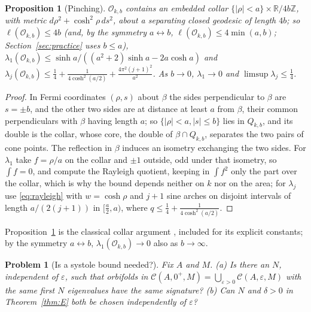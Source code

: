 \documentclass[pdflatex,sn-mathphys-num]{sn-jnl}
\theoremstyle{thmstyleone}%
\newtheorem{proposition}[theorem]{Proposition}%
\theoremstyle{thmstylethree}%
\newtheorem{problem}{Problem}%
\newcommand{\Orb}{\mathcal{O}}
\newcommand{\Cl}{\mathcal{C}}
\newcommand{\R}{\mathbb{R}}
\newcommand{\Z}{\mathbb{Z}}
\begin{document}
\begin{proposition}[Pinching]\label{prop:N2}
$\Orb_{k,b}$ contains an embedded collar $\{|\rho|<a\}\times\R/4b\Z$, with metric $d\rho^2+\cosh^2\rho\,ds^2$, about a separating closed geodesic of length $4b$; so $\ell(\Orb_{k,b})\le4b$ (and, by the symmetry $a\leftrightarrow b$, $\ell(\Orb_{k,b})\le4\min(a,b)$; Section~\ref{sec:practice} uses $b\le a$), $\lambda_1(\Orb_{k,b})\le\sinh a/((a^2+2)\sinh a-2a\cosh a)$ and $\lambda_j(\Orb_{k,b})\le\frac14+\frac1{4\cosh^2(a/2)}+\frac{4\pi^2(j+1)^2}{a^2}$. As $b\to0$, $\lambda_1\to0$ and $\limsup\lambda_j\le\frac14$.
\end{proposition}

\begin{proof}
In Fermi coordinates $(\rho,s)$ about $\beta$ the sides perpendicular to $\beta$ are $s=\pm b$, and the other two sides are at distance at least $a$ from $\beta$, their common perpendiculars with $\beta$ having length $a$; so $\{|\rho|<a,|s|\le b\}$ lies in $Q_{k,b}$, and its double is the collar, whose core, the double of $\beta\cap Q_{k,b}$, separates the two pairs of cone points. The reflection in $\beta$ induces an isometry exchanging the two sides. For $\lambda_1$ take $f=\rho/a$ on the collar and $\pm1$ outside, odd under that isometry, so $\int f=0$, and compute the Rayleigh quotient, keeping in $\int f^2$ only the part over the collar, which is why the bound depends neither on $k$ nor on the area; for $\lambda_j$ use \eqref{eq:rayleigh} with $w=\cosh\rho$ and $j+1$ sine arches on disjoint intervals of length $a/(2(j+1))$ in $[\frac a2,a)$, where $q\le\frac14+\frac1{4\cosh^2(a/2)}$.
\end{proof}

Proposition~\ref{prop:N2} is the classical collar argument \cite{buser1992}, included for its explicit constants; by the symmetry $a\leftrightarrow b$, $\lambda_1(\Orb_{k,b})\to0$ also as $b\to\infty$.

\begin{problem}[Is a systole bound needed?]\label{prob:systole}
Fix $A$ and $M$. (a) Is there an $N$, independent of $\varepsilon$, such that orbifolds in $\Cl(A,0^+,M)=\bigcup_{\varepsilon>0}\Cl(A,\varepsilon,M)$ with the same first $N$ eigenvalues have the same signature? (b) Can $N$ and $\delta>0$ in Theorem~\ref{thm:E} both be chosen independently of $\varepsilon$?
\end{problem}
\end{document}
